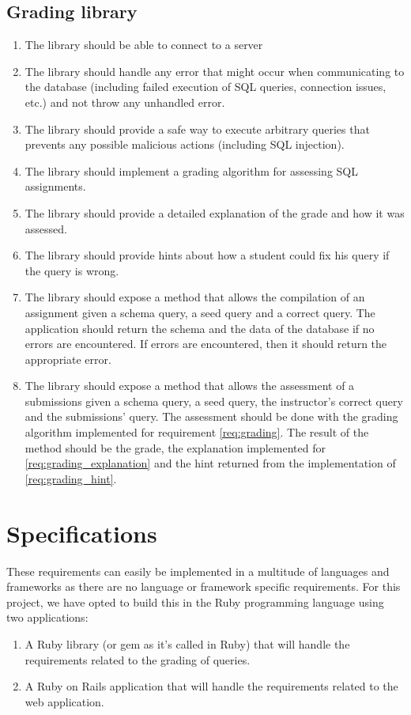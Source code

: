 \subsection{Grading library}
\begin{enumerate}[label=G-\arabic*]
  \item The library should be able to connect to a  server
  \item The library should handle any error that might occur when communicating to the database (including failed execution of SQL queries, connection issues, etc.) and not throw any unhandled error.
  \item The library should provide a safe way to execute arbitrary queries that prevents any possible malicious actions (including SQL injection).
  \item The library should implement a grading algorithm for assessing SQL assignments. \label{req:grading}
  \item The library should provide a detailed explanation of the grade and how it was assessed. \label{req:grading_explanation}
  \item The library should provide hints about how a student could fix his query if the query is wrong. \label{req:grading_hint}
  \item The library should expose a method that allows the compilation of an assignment given a schema query, a seed query and a correct query. The application should return the schema and the data of the database if no errors are encountered. If errors are encountered, then it should return the appropriate error.
  \item The library should expose a method that allows the assessment of a submissions given a schema query, a seed query, the instructor's correct query and the submissions' query.  The assessment should be done with the grading algorithm implemented for requirement \ref{req:grading}. The result of the method should be the grade, the explanation implemented for \ref{req:grading_explanation} and the hint returned from the implementation of \ref{req:grading_hint}.
\end{enumerate}

\section{Specifications} \label{ch:reqandspec:sec:spec}

These requirements can easily be implemented in a multitude of languages and frameworks as there are no language or framework specific requirements. For this project, we have opted to build this in the Ruby programming language using two applications:
\begin{enumerate}
    \item A Ruby library (or gem as it's called in Ruby) that will handle the requirements related to the grading of queries.
    \item A Ruby on Rails application that will handle the requirements related to the web application.
\end{enumerate}

